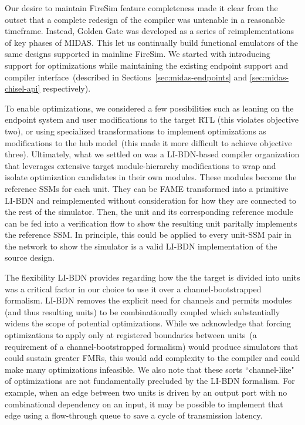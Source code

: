 Our desire to maintain FireSim feature completeness made it clear from the
outset that a complete redesign of the compiler was untenable in a reasonable timeframe. Instead, Golden
Gate was developed as a series of reimplementations of key phases of
MIDAS. This let us continually build functional emulators of the same designs
supported in mainline FireSim. We started with introducing support for
optimizations while maintaining the existing endpoint support and compiler
interface~(described in Sections~\ref{sec:midas-endpoints} and \ref{sec:midas-chisel-api}
respectively).

To enable optimizations, we considered a few possibilities such as leaning on
the endpoint system and user modifications to the target RTL (this violates
objective two), or using specialized transformations to implement optimizations
as modifications to the hub model~(this made it more difficult to
achieve objective three).  Ultimately, what we settled on was a LI-BDN-based compiler organization that leverages extensive target module-hierarchy modifications to
wrap and isolate optimization candidates in their own modules. These modules
become the reference SSMs for each unit. They can be FAME transformed into a
primitive LI-BDN and reimplemented without consideration for how they are
connected to the rest of the simulator. Then, the unit and its corresponding
reference module can be fed into a verification flow to show the resulting unit
paritally implements the reference SSM. In principle, this could be applied to
every unit-SSM pair in the network to show the simulator is a valid LI-BDN
implementation of the source design.

The flexibility LI-BDN provides regarding how the the target is divided into
units was a critical factor in our choice to use it over a channel-bootstrapped
formalism. LI-BDN removes the explicit need for channels and permits
modules (and thus resulting units) to be combinationally coupled which substantially widens the
scope of potential optimizations. While we acknowledge that forcing
optimizations to apply only at registered boundaries between units~(a
requirement of a channel-bootstrapped formalism) would produce simulators that
could sustain greater FMRs, this would add complexity to the compiler and could make
many optimizations infeasible. We also note that these sorts ``channel-like" of
optimizations are not fundamentally precluded by the LI-BDN formalism. For
example, when an edge between two units is driven by an output port with no
combinational dependency on an input, it may be possible to implement that edge
using a flow-through queue to save a cycle of transmission latency.

